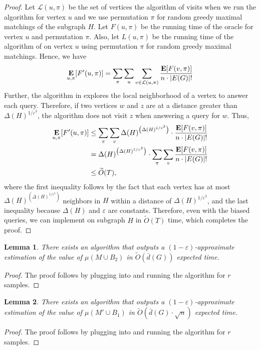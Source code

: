 \documentclass[letterpaper,11pt]{article}
\renewcommand{\epsilon}{\varepsilon}
\DeclareMathOperator{\E}{\ensuremath{\normalfont \textbf{E}}}
\newcommand{\wt}[1]{\ensuremath{\widetilde{#1}}}
\newtheorem{lemma}{Lemma}[section]
\begin{document}
\begin{proof}
    
    Let $\mathcal{L}(u, \pi)$ be the set of vertices the algorithm of  visits when we run the algorithm for vertex $u$ and we use permutation $\pi$ for random greedy maximal matchings of the subgraph $H$. Let $F(u,\pi)$ be the running time of the oracle for vertex $u$ and permutation $\pi$. Also, let $L(u, \pi)$ be the running time of the algorithm of  on vertex $u$ using permutation $\pi$ for random greedy maximal matchings. Hence, we have
    \begin{align*}
        \E_{u,\pi}[F'(u,\pi)] = \sum_\pi \sum_u \sum_{v \in \mathcal{L}(u, \pi)} \frac{\E[F(v,\pi)]}{n\cdot|E(G)|!}
    \end{align*}
    Further, the algorithm in  explores the local neighborhood of a vertex to answer each query. Therefore, if two vertices $w$ and $z$ are at a distance greater than $\Delta(H)^{1/\epsilon^3}$, the algorithm does not visit $z$ when answering a query for $w$. Thus,
    \begin{align*}
        \E_{u,\pi}[F'(u,\pi)] &\leq \sum_\pi \sum_v \Delta(H)^{\left(\Delta(H)^{1/\epsilon^3}\right)}\cdot \frac{\E[F(v,\pi)]}{n\cdot|E(G)|!}\\
        & = \Delta(H)^{\left(\Delta(H)^{1/\epsilon^3}\right)} \cdot \sum_\pi \sum_v \frac{\E[F(v,\pi)]}{n\cdot|E(G)|!}\\
        & \leq \wt{O}(T),
    \end{align*}
    where the first inequality follows by the fact that each vertex has at most $\Delta(H)^{\left(\Delta(H)^{1/\epsilon^3}\right)}$ neighbors in $H$ within a distance of $\Delta(H)^{1/\epsilon^3}$, and the last inequality because $\Delta(H)$ and $\epsilon$ are constants. Therefore, even with the biased queries, we can implement  on subgraph $H$ in $\wt{O}(T)$ time, which completes the proof.
\end{proof}



\begin{lemma}\label{lem:muMB}
    There exists an algorithm that outputs a $(1-\epsilon)$-approximate estimation of the value of $\mu(M \cup B_2)$ in $\wt{O}(\bar{d}(G))$ expected time.
\end{lemma}
\begin{proof}
    The proof follows by plugging  into  and running the algorithm for $r$ samples.
\end{proof}


\begin{lemma}\label{lem:muMMBB}
    There exists an algorithm that outputs a $(1-\epsilon)$-approximate estimation of the value of $\mu(M' \cup B_1)$ in $\wt{O}(\bar{d}(G) \cdot \sqrt{n})$ expected time.
\end{lemma}
\begin{proof}
    The proof follows by plugging  into  and running the algorithm for $r$ samples.
\end{proof}
\end{document}
